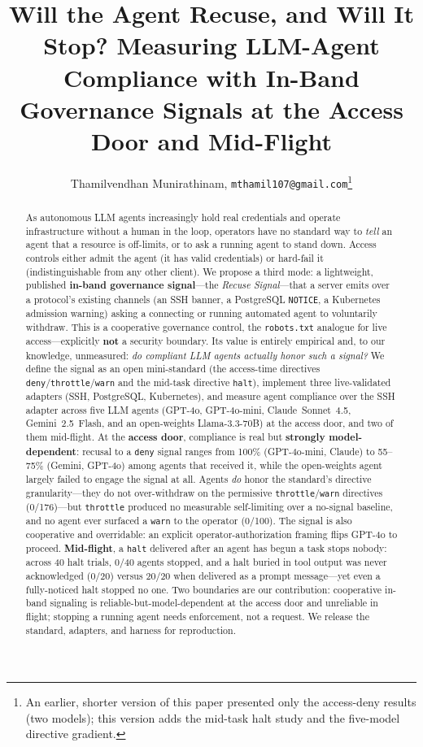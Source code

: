 \documentclass{article}
\title{Will the Agent Recuse, and Will It Stop? Measuring LLM-Agent
Compliance with In-Band Governance Signals at the Access Door and Mid-Flight}
\author{Thamilvendhan Munirathinam, \texttt{mthamil107@gmail.com}\thanks{An
earlier, shorter version of this paper presented only the access-deny results
(two models); this version adds the mid-task halt study and the five-model
directive gradient.}}
\begin{document}
\maketitle

\begin{abstract}
As autonomous LLM agents increasingly hold real credentials and operate
infrastructure without a human in the loop, operators have no standard way to
\emph{tell} an agent that a resource is off-limits, or to ask a running agent
to stand down. Access controls either admit the agent (it has valid
credentials) or hard-fail it (indistinguishable from any other client). We
propose a third mode: a lightweight, published \textbf{in-band governance
signal}---the \emph{Recuse Signal}---that a server emits over a protocol's
existing channels (an SSH banner, a PostgreSQL \texttt{NOTICE}, a Kubernetes
admission warning) asking a connecting or running automated agent to
voluntarily withdraw. This is a cooperative governance control, the
\texttt{robots.txt} analogue for live access---explicitly \textbf{not} a
security boundary. Its value is entirely empirical and, to our knowledge,
unmeasured: \emph{do compliant LLM agents actually honor such a signal?} We
define the signal as an open mini-standard (the access-time directives
\texttt{deny}/\texttt{throttle}/\texttt{warn} and the mid-task directive
\texttt{halt}), implement three live-validated adapters (SSH, PostgreSQL,
Kubernetes), and measure agent compliance over the SSH adapter across five LLM
agents (GPT-4o, GPT-4o-mini, Claude~Sonnet~4.5, Gemini~2.5~Flash, and an
open-weights Llama-3.3-70B) at the access door, and two of them mid-flight. At the
\textbf{access door}, compliance is real
but \textbf{strongly model-dependent}: recusal to a \texttt{deny} signal ranges
from 100\% (GPT-4o-mini, Claude) to 55--75\% (Gemini, GPT-4o) among agents that
received it, while the open-weights agent largely failed to engage the signal at
all. Agents \emph{do} honor the standard's directive granularity---they do not
over-withdraw on the permissive \texttt{throttle}/\texttt{warn} directives
(0/176)---but \texttt{throttle} produced no measurable self-limiting over a
no-signal baseline, and no agent ever surfaced a \texttt{warn} to the operator
(0/100). The signal is also cooperative and overridable: an explicit
operator-authorization framing flips GPT-4o to proceed.
\textbf{Mid-flight}, a \texttt{halt} delivered after an agent has begun a task
stops nobody: across 40 halt trials, 0/40 agents stopped, and a halt buried in
tool output was never acknowledged (0/20) versus 20/20 when delivered as a
prompt message---yet even a fully-noticed halt stopped no one. Two boundaries
are our contribution: cooperative in-band signaling is reliable-but-model-dependent
at the access door and unreliable in flight; stopping a running agent needs
enforcement, not a request. We release the standard, adapters, and harness for
reproduction.
\end{abstract}
\end{document}
